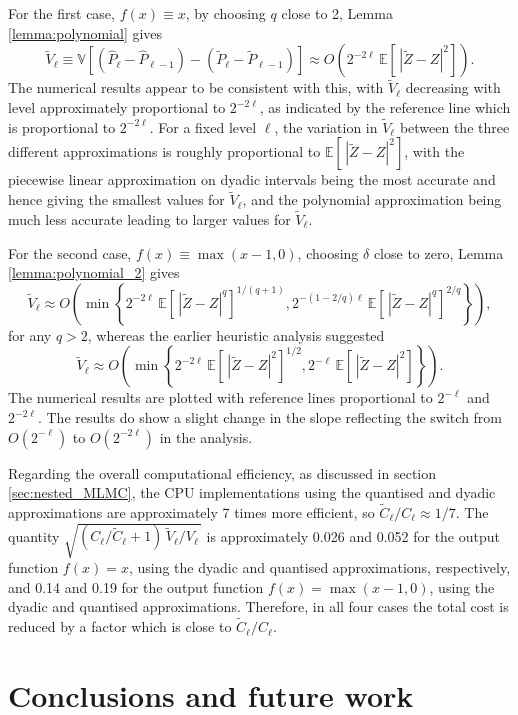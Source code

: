 \documentclass[review]{siamart190516}
\def \EE {{\mathbb{E}}}
\def \VV {{\mathbb{V}}}
\def \tP {{\widetilde{P}}}
\def \tZ {{\widetilde{Z}}}
\def \tC {{\widetilde{C}}}
\def \tV {{\widetilde{V}}}
\def \hP {{\widehat{P}}}
\begin{document}
For the first case, $f(x) {\equiv} x$, by choosing $q$ close to 2,
Lemma \ref{lemma:polynomial} gives
\[
\tV_\ell \equiv
\VV\left[ (\hP_\ell{-} \hP_{\ell-1}) - (\tP_\ell {-} \tP_{\ell-1}) \right]
\approx O\left( 2^{-2\ell}\, \EE[\, | \tZ{-}Z|^2 ]\right).
\]
The numerical results appear to be consistent with this, with
$\tV_\ell$ decreasing with level approximately proportional to
$2^{-2\ell}$, as indicated by the reference line which is
proportional to $2^{-2\ell}$. For a fixed level $\ell$, the
variation in $\tV_\ell$ between the three different approximations
is roughly proportional to $\EE[\, | \tZ{-}Z|^2 ]$,
with the piecewise linear approximation on dyadic intervals being
the most accurate and hence giving the smallest values for $\tV_\ell$,
and the polynomial approximation being much less accurate leading
to larger values for $\tV_\ell$.

For the second case, $f(x) {\equiv} \max(x{-}1,0)$,
choosing $\delta$ close to zero, Lemma \ref{lemma:polynomial_2} gives
\[
  \tV_\ell \approx O\left(  \min\left\{ 2^{-2\ell}\, \EE[\, | \tZ{-}Z|^q ]^{1/(q+1)},
   2^{-(1-2/q)\ell}\, \EE[\, | \tZ{-}Z|^q ]^{2/q} \right\}  \right),
\]
for any $q{>}2$, whereas the earlier heuristic analysis suggested
\[
\tV_\ell \approx O\left( \min\left\{ 2^{-2\ell}\, \EE[\, |\tZ{-}Z|^2]^{1/2},
                       2^{-\ell}\, \EE[\, |\tZ{-}Z|^2] \right\} \right).
\]
The numerical results are plotted with reference lines proportional
to $2^{-\ell}$ and $2^{-2\ell}$.  The results do show a slight change in
the slope reflecting the switch from $O(2^{-\ell})$ to $O(2^{-2\ell})$
in the analysis.

Regarding the overall computational efficiency, as discussed in section
\ref{sec:nested_MLMC}, the CPU implementations using the quantised and
dyadic approximations are approximately 7 times more efficient, so
$\tC_\ell/C_\ell \approx 1/7$.  The quantity
$\sqrt{(C_\ell/\tC_\ell + 1)\, \tV_\ell/V_\ell \,}$ is approximately
0.026 and 0.052 for the output function $f(x){=}x$, using the dyadic and
quantised approximations, respectively, and
0.14 and 0.19 for the output function $f(x){=}\max(x{-}1,0)$, using the
dyadic and quantised approximations. Therefore, in all four cases
the total cost is reduced by a factor which is close to $\tC_\ell/C_\ell$.


\section{Conclusions and future work}
\end{document}
